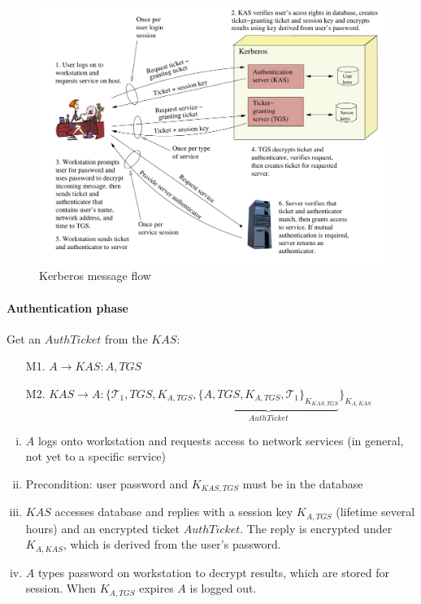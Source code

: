 \begin{figure}[h]
    \centering
    \includegraphics[width=14cm]{images/ch9-kerberos-messages.png}
    \caption{Kerberos message flow}
    \label{fig:kerberos-messages}
\end{figure}

\paragraph{Authentication phase} Get an $AuthTicket$ from the $KAS$:

\begin{itemize}[leftmargin=4cm]
    \item [M1.] $A \rightarrow KAS: A, TGS$
    \item [M2.] $KAS \rightarrow A: \{ \mathcal{T}_1, TGS, K_{A,TGS}, \underbrace{ \{A, TGS, K_{A,TGS}, \mathcal{T}_1 \}_{K_{KAS,TGS}} }_{AuthTicket} \} _{K_{A,KAS}}$
\end{itemize}

\begin{enumerate}[i)]
    \item $A$ logs onto workstation and requests access to network services (in general, not yet to a specific service)
    \item Precondition: user password and $K_{KAS, TGS}$ must be in the database
    \item $KAS$ accesses database and replies with a session key $K_{A, TGS}$ (lifetime several hours) and an encrypted ticket $AuthTicket$. The reply is encrypted under $K_{A, KAS}$, which is derived from the user's password.
    \item $A$ types password on workstation to decrypt results, which are stored for session. When $K_{A, TGS}$ expires $A$ is logged out.
\end{enumerate}

